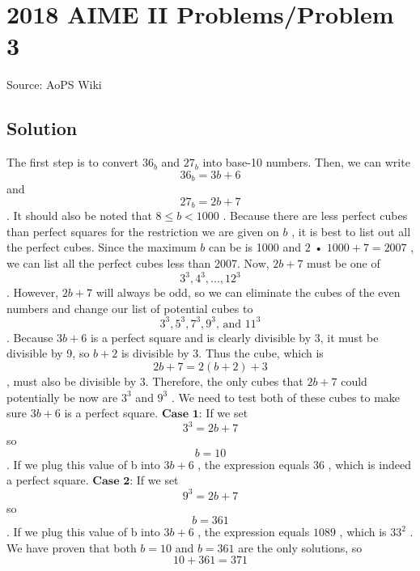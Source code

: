 \documentclass[12pt]{article}
\begin{document}
\section*{{2018 AIME II Problems/Problem 3}}
Source: AoPS Wiki

\subsection*{Solution}
The first step is to convert $36_{b}$ and $27_{b}$ into base-10 numbers. Then, we can write \[36_{b} = 3b + 6\] and \[27_{b} = 2b + 7\] . It should also be noted that $8 \leq b < 1000$ . Because there are less perfect cubes than perfect squares for the restriction we are given on $b$ , it is best to list out all the perfect cubes. Since the maximum $b$ can be is 1000 and $2$ • $1000 + 7 = 2007$ , we can list all the perfect cubes less than 2007. Now, $2b + 7$ must be one of \[3^3, 4^3, ... , 12^3\] . However, $2b + 7$ will always be odd, so we can eliminate the cubes of the even numbers and change our list of potential cubes to \[3^3, 5^3, 7^3, 9^3\text{, and }11^3\] . Because $3b + 6$ is a perfect square and is clearly divisible by 3, it must be divisible by 9, so $b + 2$ is divisible by 3. Thus the cube, which is \[2b + 7 = 2(b + 2) + 3\] , must also be divisible by 3. Therefore, the only cubes that $2b + 7$ could potentially be now are $3^3$ and $9^3$ . We need to test both of these cubes to make sure $3b + 6$ is a perfect square. $\textbf{Case 1:}$ If we set \[3^3 = 2b + 7\] so \[b = 10\] . If we plug this value of b into $3b + 6$ , the expression equals $36$ , which is indeed a perfect square. $\textbf{Case 2:}$ If we set \[9^3 = 2b + 7\] so \[b = 361\] . If we plug this value of b into $3b + 6$ , the expression equals $1089$ , which is $33^2$ . We have proven that both $b = 10$ and $b = 361$ are the only solutions, so \[10 + 361 = \boxed{371}\]
\end{document}
